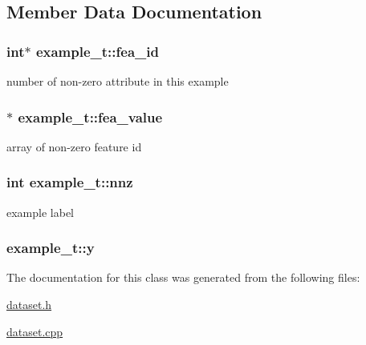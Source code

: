 \subsection{Member Data Documentation}
\hypertarget{classexample__t_a48940c5caff1e78969f1e2c2e7049532}{
\subsubsection[{fea\+\_\+id}]{\setlength{\rightskip}{0pt plus 5cm}int$\ast$ example\+\_\+t\+::fea\+\_\+id}}\label{classexample__t_a48940c5caff1e78969f1e2c2e7049532}
number of non-\/zero attribute in this example \hypertarget{classexample__t_acac894d54d087a9a5f27f063003d5b72}{
\subsubsection[{fea\+\_\+value}]{$\ast$ example\+\_\+t\+::fea\+\_\+value}}\label{classexample__t_acac894d54d087a9a5f27f063003d5b72}
array of non-\/zero feature id \hypertarget{classexample__t_a6501a26509c4d186310a5f51c7a9ddf8}{
\subsubsection[{nnz}]{\setlength{\rightskip}{0pt plus 5cm}int example\+\_\+t\+::nnz}}\label{classexample__t_a6501a26509c4d186310a5f51c7a9ddf8}
example label \hypertarget{classexample__t_a71bd4c6e68d5eb4543b84c47599e72bb}{
\subsubsection[{y}]{ example\+\_\+t\+::y}}\label{classexample__t_a71bd4c6e68d5eb4543b84c47599e72bb}


The documentation for this class was generated from the following files\+:\begin{DoxyCompactItemize}
\item 
\hyperlink{dataset_8h}{dataset.\+h}\item 
\hyperlink{dataset_8cpp}{dataset.\+cpp}\end{DoxyCompactItemize}
